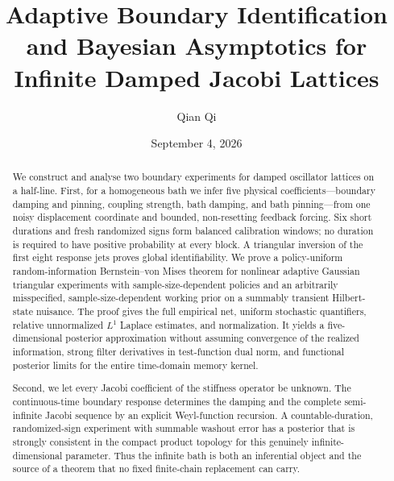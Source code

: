 \documentclass[11pt,reqno]{amsart}
\title[Adaptive boundary identification]{Adaptive Boundary Identification and Bayesian Asymptotics for Infinite Damped Jacobi Lattices}
\author{Qian Qi}
\date{September 4, 2026}
\begin{document}
\begin{abstract}
We construct and analyse two boundary experiments for damped oscillator lattices on a half-line.  First, for a homogeneous bath we infer five physical coefficients---boundary damping and pinning, coupling strength, bath damping, and bath pinning---from one noisy displacement coordinate and bounded, non-resetting feedback forcing.  Six short durations and fresh randomized signs form balanced calibration windows; no duration is required to have positive probability at every block.  A triangular inversion of the first eight response jets proves global identifiability.  We prove a policy-uniform random-information Bernstein--von Mises theorem for nonlinear adaptive Gaussian triangular experiments with sample-size-dependent policies and an arbitrarily misspecified, sample-size-dependent working prior on a summably transient Hilbert-state nuisance.  The proof gives the full empirical net, uniform stochastic quantifiers, relative unnormalized \(L^1\) Laplace estimates, and normalization.  It yields a five-dimensional posterior approximation without assuming convergence of the realized information, strong filter derivatives in test-function dual norm, and functional posterior limits for the entire time-domain memory kernel.

Second, we let every Jacobi coefficient of the stiffness operator be unknown.  The continuous-time boundary response determines the damping and the complete semi-infinite Jacobi sequence by an explicit Weyl-function recursion.  A countable-duration, randomized-sign experiment with summable washout error has a posterior that is strongly consistent in the compact product topology for this genuinely infinite-dimensional parameter.  Thus the infinite bath is both an inferential object and the source of a theorem that no fixed finite-chain replacement can carry.
\end{abstract}

\maketitle
\tableofcontents








\appendix


\end{document}

